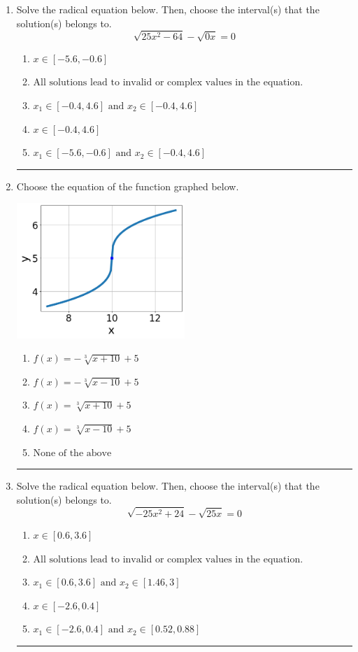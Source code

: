 \documentclass[14pt]{extbook}
\newcommand{\litem}[1]{\item#1\hspace*{-1cm}\rule{\textwidth}{0.4pt}}
\begin{document}
\begin{enumerate}
\litem{
Solve the radical equation below. Then, choose the interval(s) that the solution(s) belongs to.\[ \sqrt{25 x^2 - 64} - \sqrt{0 x} = 0 \]\begin{enumerate}[label=\Alph*.]
\item \( x \in [-5.6,-0.6] \)
\item \( \text{All solutions lead to invalid or complex values in the equation.} \)
\item \( x_1 \in [-0.4, 4.6] \text{ and } x_2 \in [-0.4,4.6] \)
\item \( x \in [-0.4,4.6] \)
\item \( x_1 \in [-5.6, -0.6] \text{ and } x_2 \in [-0.4,4.6] \)

\end{enumerate} }
\litem{
Choose the equation of the function graphed below.
\begin{center}
    \includegraphics[width=0.5\textwidth]{../Figures/radicalGraphToEquationC.png}
\end{center}
\begin{enumerate}[label=\Alph*.]
\item \( f(x) = - \sqrt[3]{x + 10} + 5 \)
\item \( f(x) = - \sqrt[3]{x - 10} + 5 \)
\item \( f(x) = \sqrt[3]{x + 10} + 5 \)
\item \( f(x) = \sqrt[3]{x - 10} + 5 \)
\item \( \text{None of the above} \)

\end{enumerate} }
\litem{
Solve the radical equation below. Then, choose the interval(s) that the solution(s) belongs to.\[ \sqrt{-25 x^2 + 24} - \sqrt{25 x} = 0 \]\begin{enumerate}[label=\Alph*.]
\item \( x \in [0.6,3.6] \)
\item \( \text{All solutions lead to invalid or complex values in the equation.} \)
\item \( x_1 \in [0.6, 3.6] \text{ and } x_2 \in [1.46,3] \)
\item \( x \in [-2.6,0.4] \)
\item \( x_1 \in [-2.6, 0.4] \text{ and } x_2 \in [0.52,0.88] \)


\end{enumerate}}
\end{enumerate}
\end{document}
